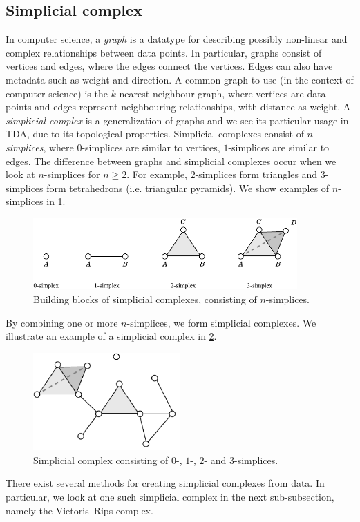 \subsection{Simplicial complex}
\label{sec:simplicial-complex}
In computer science, a \textit{graph} is a datatype for describing possibly non-linear and complex relationships between data points. In particular, graphs consist of vertices and edges, where the edges connect the vertices. Edges can also have metadata such as weight and direction. A common graph to use (in the context of computer science) is the $k$-nearest neighbour graph, where vertices are data points and edges represent neighbouring relationships, with distance as weight. A \textit{simplicial complex} is a generalization of graphs and we see its particular usage in TDA, due to its topological properties. Simplicial complexes consist of \textit{$n$-simplices}, where $0$-simplices are similar to vertices, $1$-simplices are similar to edges. The difference between graphs and simplicial complexes occur when we look at $n$-simplices for $n \geq 2$. For example, $2$-simplices form triangles and $3$-simplices form tetrahedrons (i.e. triangular pyramids). We show examples of $n$-simplices in \cref{fig:n-simplices-example}.
\begin{figure}[H]
    \centering
    \includegraphics[width=0.9\textwidth]{thesis/figures/n-simplices_cropped.pdf}
    \caption{Building blocks of simplicial complexes, consisting of $n$-simplices.}
    \label{fig:n-simplices-example}
\end{figure}
By combining one or more $n$-simplices, we form simplicial complexes. We illustrate an example of a simplicial complex in \cref{fig:simplicial-complex}.
\begin{figure}[H]
    \centering
    \includegraphics[width=0.5\textwidth]{thesis/figures/simplicial-complex_cropped.pdf}
    \caption{Simplicial complex consisting of $0$-, $1$-, $2$- and $3$-simplices.}
    \label{fig:simplicial-complex}
\end{figure}
There exist several methods for creating simplicial complexes from data. In particular, we look at one such simplicial complex in the next sub-subsection, namely the Vietoris–Rips complex.

